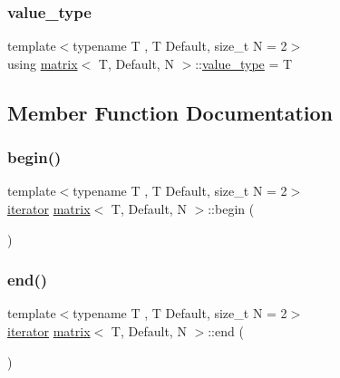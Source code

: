 \mbox{\label{structmatrix_aeb660563444929ee10d8a0b06d42a951}} 
\subsubsection{\texorpdfstring{value\+\_\+type}{value\_type}}
{\footnotesize\ttfamily template$<$typename T , T Default, size\+\_\+t N = 2$>$ \\
using \hyperlink{structmatrix}{matrix}$<$ T, Default, N $>$\+::\hyperlink{structmatrix_aeb660563444929ee10d8a0b06d42a951}{value\+\_\+type} =  T}



\subsection{Member Function Documentation}
\mbox{\label{structmatrix_aa89133051ced06904a790d03b7b11fea}} 
\subsubsection{\texorpdfstring{begin()}{begin()}}
{\footnotesize\ttfamily template$<$typename T , T Default, size\+\_\+t N = 2$>$ \\
\hyperlink{structmatrix_1_1iterator}{iterator} \hyperlink{structmatrix}{matrix}$<$ T, Default, N $>$\+::begin (\begin{DoxyParamCaption}{ }\end{DoxyParamCaption})\hspace{0.3cm}{\ttfamily [inline]}}

\mbox{\label{structmatrix_ae53919855895643ac043280793075c6d}} 
\subsubsection{\texorpdfstring{end()}{end()}}
{\footnotesize\ttfamily template$<$typename T , T Default, size\+\_\+t N = 2$>$ \\
\hyperlink{structmatrix_1_1iterator}{iterator} \hyperlink{structmatrix}{matrix}$<$ T, Default, N $>$\+::end (\begin{DoxyParamCaption}{ }\end{DoxyParamCaption})\hspace{0.3cm}{\ttfamily [inline]}}

